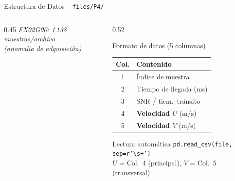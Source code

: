 \documentclass[aspectratio=169,12pt]{beamer}
\begin{document}
\begin{frame}{Estructura de Datos -- \texttt{files/P4/}}
\begin{columns}
\begin{column}{0.45\textwidth}
			\vspace{0.3em}
			\textit{\tiny FX02G00: 1\,138 muestras/archivo\\
				(anomalía de adquisición)}
		\end{column}
		\begin{column}{0.52\textwidth}
			\begin{block}{Formato de datos (5 columnas)}
				\scriptsize
				\begin{tabular}{cl}
					\toprule
					\textbf{Col.} & \textbf{Contenido}           \\
					\midrule
					1             & Índice de muestra            \\
					2             & Tiempo de llegada (ms)       \\
					3             & SNR / tiem.\ tránsito        \\
					4             & \textbf{Velocidad $U$} (m/s) \\
					5             & \textbf{Velocidad $V$} (m/s) \\
					\bottomrule
				\end{tabular}
			\end{block}
			\vspace{0.2em}
			\begin{exampleblock}{Lectura automática}
				\scriptsize
				\texttt{pd.read\_csv(file, sep=r'\textbackslash s+')}\\
				$U$ = Col.~4 (principal), $V$ = Col.~5 (transversal)
			\end{exampleblock}
		\end{column}
	\end{columns}
\end{frame}
\end{document}
